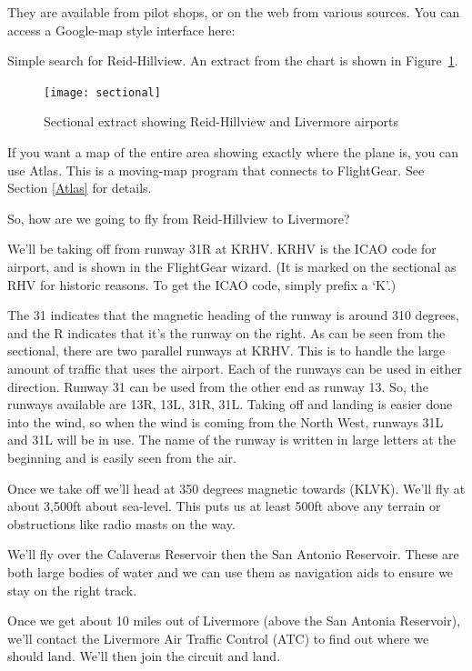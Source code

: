 They are available from pilot shops, or on the web from various sources.
You can access a Google-map style interface here:

\medskip
{}
\medskip

Simple search for Reid-Hillview. An extract from the chart is shown in Figure~\ref{sectional}.

\begin{figure}[!htp]
\centering
\texttt{[image: sectional]}
\caption{Sectional extract showing Reid-Hillview and Livermore airports\label{sectional}}
\end{figure}

If you want a map of the entire area showing exactly where the plane is,
you can use Atlas.
This is a moving-map program that connects to FlightGear. See Section \ref{Atlas} for details.

So, how are we going to fly from Reid-Hillview to Livermore?

We'll be taking off from runway 31R at KRHV. KRHV is the ICAO code
for  airport, and is shown in the FlightGear wizard.
(It is marked on the sectional as RHV for historic reasons.
To get the ICAO code, simply prefix a `K'.)

The 31 indicates that the magnetic heading of the runway is around 310 degrees,
and the R indicates that it's the runway on the right. As can be seen from the
sectional, there are two parallel runways at KRHV. This is to handle the large
amount of traffic that uses the airport. Each of the runways can be used in
either direction. Runway 31 can be used from the other end as runway 13.
So, the runways available are 13R, 13L, 31R, 31L. Taking off and landing
is easier done into the wind, so when the wind is coming from the North West,
runways 31L and 31L will be in use. The name of the runway is written in large
letters at the beginning and is easily seen from the air.

Once we take off we'll head at 350 degrees magnetic towards  (KLVK).
We'll fly at about 3,500ft about sea-level. This puts us at least 500ft above any
terrain or obstructions like radio masts on the way.

We'll fly over the Calaveras Reservoir then the San Antonio Reservoir. These are
both large bodies of water and we can use them as navigation aids to ensure we
stay on the right track.

Once we get about 10 miles out of Livermore (above the San Antonia Reservoir),
we'll contact the Livermore Air Traffic Control (ATC) to find out
where we should land. We'll then join the circuit and land.

